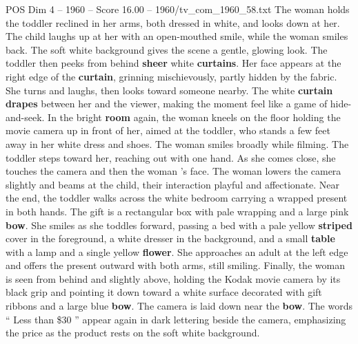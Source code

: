 \begin{textsample}{POS Dim 4 – 1960 – Score 16.00 – 1960/tv\_com\_1960\_58.txt}
The woman holds the toddler reclined in her arms, both dressed in white, and looks down at her.
The child laughs up at her with an open-mouthed smile, while the woman smiles back.
The soft white background gives the scene a gentle, glowing look.
The toddler then peeks from behind \textbf{sheer} white \textbf{curtains}.
Her face appears at the right edge of the \textbf{curtain}, grinning mischievously, partly hidden by the fabric.
She turns and laughs, then looks toward someone nearby.
The white \textbf{curtain} \textbf{drapes} between her and the viewer, making the moment feel like a game of hide-and-seek.
In the bright \textbf{room} again, the woman kneels on the floor holding the movie camera up in front of her, aimed at the toddler, who stands a few feet away in her white dress and shoes.
The woman smiles broadly while filming.
The toddler steps toward her, reaching out with one hand.
As she comes close, she touches the camera and then the woman ’s face.
The woman lowers the camera slightly and beams at the child, their interaction playful and affectionate.
Near the end, the toddler walks across the white bedroom carrying a wrapped present in both hands.
The gift is a rectangular box with pale wrapping and a large pink \textbf{bow}.
She smiles as she toddles forward, passing a bed with a pale yellow \textbf{striped} cover in the foreground, a white dresser in the background, and a small \textbf{table} with a lamp and a single yellow \textbf{flower}.
She approaches an adult at the left edge and offers the present outward with both arms, still smiling.
Finally, the woman is seen from behind and slightly above, holding the Kodak movie camera by its black grip and pointing it down toward a white surface decorated with gift ribbons and a large blue \textbf{bow}.
The camera is laid down near the \textbf{bow}.
The words “ Less than \$30 ” appear again in dark lettering beside the camera, emphasizing the price as the product rests on the soft white background.

\end{textsample}
